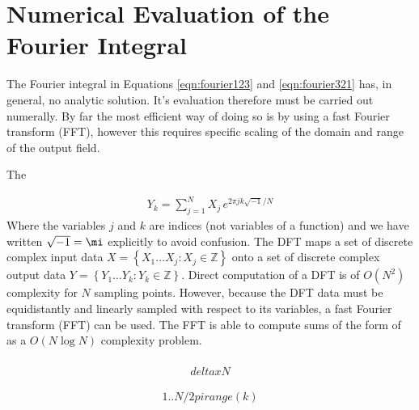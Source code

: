 \section{Numerical Evaluation of the Fourier Integral}
The Fourier integral in Equations \ref{eqn:fourier123} and
\ref{eqn:fourier321} has, in general, no analytic solution.  It's
evaluation therefore must be carried out numerally.  By far the most
efficient way of doing so is by using a fast Fourier transform (FFT),
however this requires specific scaling of the domain and range of the
output field.

The 

\begin{align}
Y_k = \sum_{j=1}^{N} X_j\, e^{2\pi j k\sqrt{-1}/N}
\label{eqn:dft}
\end{align}
Where the variables $j$ and $k$ are indices (not variables of a function)
and we have written $\sqrt{-1}=\mi$ explicitly to avoid confusion.
The DFT maps a set of discrete complex input data
$X = \left\{X_1\dots X_j : X_j\in\mathbb{Z}\right\}$ onto a set of
discrete complex output data $Y =
\left\{Y_1\dots Y_k : Y_k\in\mathbb{Z}\right\}$.  
Direct computation of a DFT is of $O(N^2)$ complexity for $N$ sampling
points.  However, because the DFT data must be equidistantly and linearly
sampled with respect to its variables, a fast Fourier transform (FFT) can
be used. The FFT is able to compute sums of the form of 
as a $O(N \log N)$ complexity problem. 
\begin{align}

\end{align}

\begin{align}
deltax N
\end{align}

\begin{align}
1..N / 2 pi range(k)
\end{align}

